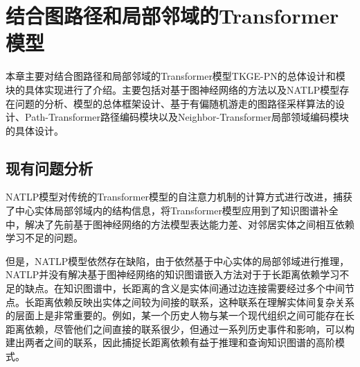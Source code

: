 \chapter{结合图路径和局部邻域的Transformer模型}

本章主要对结合图路径和局部邻域的Transformer模型TKGE-PN的总体设计和模块的具体实现进行了介绍。主要包括对基于图神经网络的方法以及NATLP模型存在问题的分析、模型的总体框架设计、基于有偏随机游走的图路径采样算法的设计、Path-Transformer路径编码模块以及Neighbor-Transformer局部领域编码模块的具体设计。

\section{现有问题分析}
NATLP模型对传统的Transformer模型的自注意力机制的计算方式进行改进，捕获了中心实体局部邻域内的结构信息，将Transformer模型应用到了知识图谱补全中，解决了先前基于图神经网络的方法模型表达能力差、对邻居实体之间相互依赖学习不足的问题。

但是，NATLP模型依然存在缺陷，由于依然基于中心实体的局部邻域进行推理，NATLP并没有解决基于图神经网络的知识图谱嵌入方法对于于长距离依赖学习不足的缺点。在知识图谱中，长距离的含义是实体间通过边连接需要经过多个中间节点。长距离依赖反映出实体之间较为间接的联系，这种联系在理解实体间复杂关系的层面上是非常重要的。例如，某一个历史人物与某一个现代组织之间可能存在长距离依赖，尽管他们之间直接的联系很少，但通过一系列历史事件和影响，可以构建出两者之间的联系，因此捕捉长距离依赖有益于推理和查询知识图谱的高阶模式。

